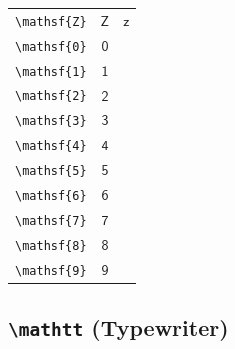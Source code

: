 \documentclass[12pt,a4paper]{article}
\begin{document}
\begin{longtable}{|c|c|c|}
\verb|\mathsf{Z}| & $\mathsf{Z}$ & $\mathsf{z}$ \\ %
\verb|\mathsf{0}| & $\mathsf{0}$ & \\ %
\verb|\mathsf{1}| & $\mathsf{1}$ & \\ %
\verb|\mathsf{2}| & $\mathsf{2}$ & \\ %
\verb|\mathsf{3}| & $\mathsf{3}$ & \\ %
\verb|\mathsf{4}| & $\mathsf{4}$ & \\ %
\verb|\mathsf{5}| & $\mathsf{5}$ & \\ %
\verb|\mathsf{6}| & $\mathsf{6}$ & \\ %
\verb|\mathsf{7}| & $\mathsf{7}$ & \\ %
\verb|\mathsf{8}| & $\mathsf{8}$ & \\ %
\verb|\mathsf{9}| & $\mathsf{9}$ & \\ %
\hline
\end{longtable}

\newpage

\subsection*{\texttt{\textbackslash{}mathtt} (Typewriter)}
\end{document}
